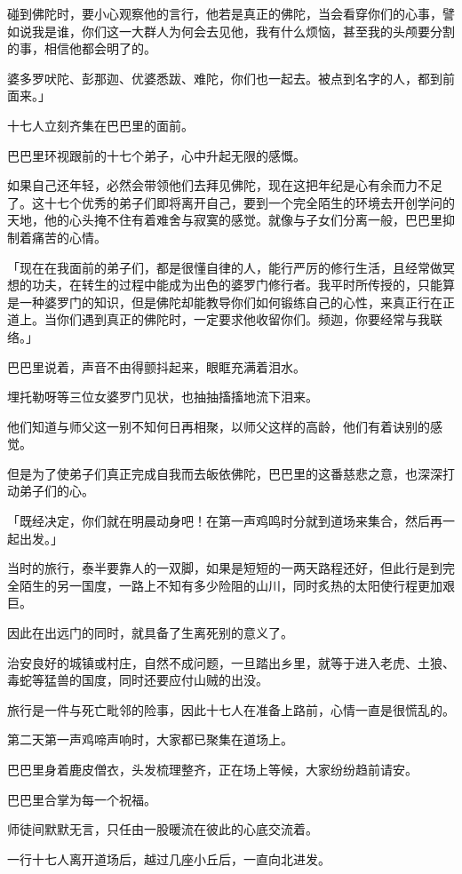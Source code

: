 \documentclass[twoside,openany]{book}
\begin{document}
碰到佛陀时，要小心观察他的言行，他若是真正的佛陀，当会看穿你们的心事，譬如说我是谁，你们这一大群人为何会去见他，我有什么烦恼，甚至我的头颅要分割的事，相信他都会明了的。

婆多罗吠陀、彭那迦、优婆悉跋、难陀，你们也一起去。被点到名字的人，都到前面来。」

十七人立刻齐集在巴巴里的面前。

巴巴里环视跟前的十七个弟子，心中升起无限的感慨。

如果自己还年轻，必然会带领他们去拜见佛陀，现在这把年纪是心有余而力不足了。这十七个优秀的弟子们即将离开自己，要到一个完全陌生的环境去开创学问的天地，他的心头掩不住有着难舍与寂寞的感觉。就像与子女们分离一般，巴巴里抑制着痛苦的心情。

「现在在我面前的弟子们，都是很懂自律的人，能行严厉的修行生活，且经常做冥想的功夫，在转生的过程中能成为出色的婆罗门修行者。我平时所传授的，只能算是一种婆罗门的知识，但是佛陀却能教导你们如何锻练自己的心性，来真正行在正道上。当你们遇到真正的佛陀时，一定要求他收留你们。频迦，你要经常与我联络。」

巴巴里说着，声音不由得颤抖起来，眼眶充满着泪水。

埋托勒呀等三位女婆罗门见状，也抽抽搐搐地流下泪来。

他们知道与师父这一别不知何日再相聚，以师父这样的高龄，他们有着诀别的感觉。

但是为了使弟子们真正完成自我而去皈依佛陀，巴巴里的这番慈悲之意，也深深打动弟子们的心。

「既经决定，你们就在明晨动身吧！在第一声鸡鸣时分就到道场来集合，然后再一起出发。」

当时的旅行，泰半要靠人的一双脚，如果是短短的一两天路程还好，但此行是到完全陌生的另一国度，一路上不知有多少险阻的山川，同时炙热的太阳使行程更加艰巨。

因此在出远门的同时，就具备了生离死别的意义了。

治安良好的城镇或村庄，自然不成问题，一旦踏出乡里，就等于进入老虎、土狼、毒蛇等猛兽的国度，同时还要应付山贼的出没。

旅行是一件与死亡毗邻的险事，因此十七人在准备上路前，心情一直是很慌乱的。

第二天第一声鸡啼声响时，大家都已聚集在道场上。

巴巴里身着鹿皮僧衣，头发梳理整齐，正在场上等候，大家纷纷趋前请安。

巴巴里合掌为每一个祝福。

师徒间默默无言，只任由一股暖流在彼此的心底交流着。

一行十七人离开道场后，越过几座小丘后，一直向北进发。
\end{document}
